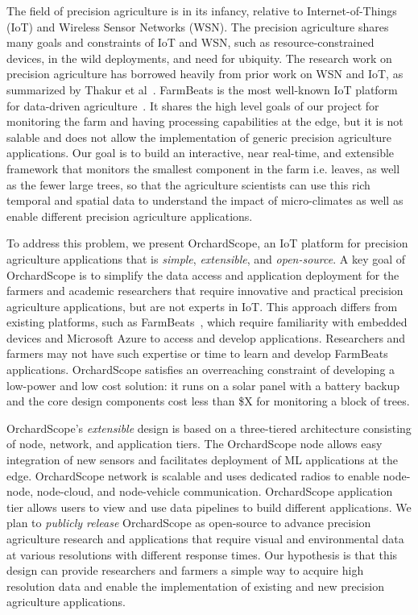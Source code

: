 The field of precision agriculture is in its infancy, relative to Internet-of-Things (IoT) and Wireless Sensor Networks (WSN). The precision agriculture shares many goals and constraints of IoT and WSN, such as resource-constrained devices, in the wild deployments, and need for ubiquity. The research work on precision agriculture has borrowed heavily from prior work on WSN and IoT, as summarized by Thakur et al~\cite{thakur2019applicability}. FarmBeats is the most well-known IoT platform for data-driven agriculture~\cite{vasisht2017farmbeats, kapetanovic2017experiences, jain2019low}. It shares the high level goals of our project for monitoring the farm and having processing capabilities at the edge, but it is not salable and does not allow the implementation of generic precision agriculture applications. 
Our goal is to build an interactive, near real-time, and extensible framework that monitors the smallest component in the farm i.e. leaves, as well as the fewer large trees, so that the agriculture scientists can use this rich temporal and spatial data to understand the impact of micro-climates as well as enable different precision agriculture applications.


To address this problem, we present OrchardScope, an IoT platform for precision agriculture applications that is \emph{simple}, \emph{extensible}, and \emph{open-source}. A key goal of OrchardScope is to simplify the data access and application deployment for the farmers and academic researchers that require innovative and practical precision agriculture applications, but are not experts in IoT. This approach differs from existing platforms, such as FarmBeats~\cite{vasisht2017farmbeats}, which require familiarity with embedded devices and Microsoft Azure to access and develop applications. Researchers and farmers may not have such expertise or time to learn and develop FarmBeats applications. OrchardScope satisfies an overreaching constraint of developing a low-power and low cost solution: it runs on a solar panel with a battery backup and the core design components cost less than \$X for monitoring a block of trees. 

OrchardScope's \emph{extensible} design is based on a three-tiered architecture consisting of node, network, and application tiers. The OrchardScope node allows easy integration of new sensors and facilitates deployment of ML applications at the edge. OrchardScope network is scalable and uses dedicated radios to enable node-node, node-cloud, and node-vehicle communication. OrchardScope application tier allows users to view and use data pipelines to build different applications. We plan to \emph{publicly release} OrchardScope as open-source to advance precision agriculture research and applications that require visual and environmental data at various resolutions with different response times. Our hypothesis is that this design can provide researchers and farmers a simple way to acquire high resolution data and enable the implementation of existing and new precision agriculture applications. 

